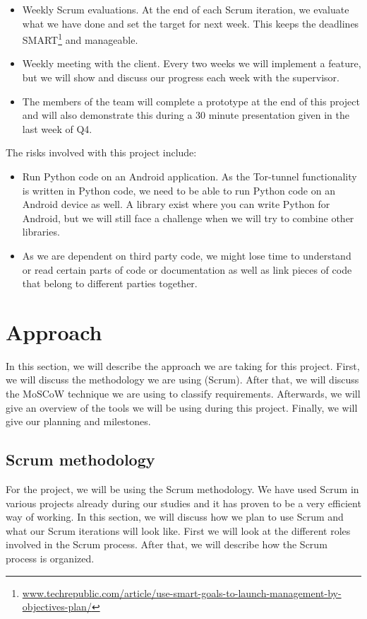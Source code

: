 \begin{itemize}
\item Weekly Scrum evaluations. At the end of each Scrum iteration, we evaluate what we have done and set the target for next week. This keeps the deadlines SMART\footnote{\href{http://www.techrepublic.com/article/use-smart-goals-to-launch-management-by-objectives-plan/}{www.techrepublic.com/article/use-smart-goals-to-launch-management-by-objectives-plan/}} and manageable.
\item Weekly meeting with the client. Every two weeks we will implement a feature, but we will show and discuss our progress each week with the supervisor.
\item The members of the team will complete a prototype at the end of this project and will also demonstrate this during a 30 minute presentation given in the last week of Q4.
\end{itemize}

The risks involved with this project include:
\begin{itemize}
\item Run Python code on an Android application. As the Tor-tunnel functionality is written in Python code, we need to be able to run Python code on an Android device as well. A library exist where you can write Python for Android, but we will still face a challenge when we will try to combine other libraries.
\item As we are dependent on third party code, we might lose time to understand or read certain parts of code or documentation as well as link pieces of code that belong to different parties together.
\end{itemize}



\section{Approach}
In this section, we will describe the approach we are taking for this project. First, we will discuss the methodology we are using (Scrum). After that, we will discuss the MoSCoW technique we are using to classify requirements. Afterwards, we will give an overview of the tools we will be using during this project. Finally, we will give our planning and milestones.

\subsection{Scrum methodology}
For the project, we will be using the Scrum methodology. We have used Scrum in various projects already during our studies and it has proven to be a very efficient way of working. In this section, we will discuss how we plan to use Scrum and what our Scrum iterations will look like. First we will look at the different roles involved in the Scrum process. After that, we will describe how the Scrum process is organized.

